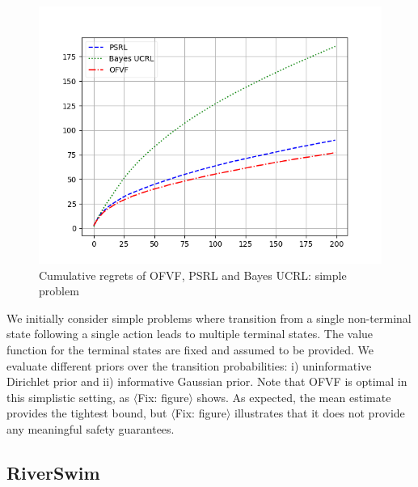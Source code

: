 \documentclass{article}
\newcommand{\fix}[1]{{$\langle${\color{red}\sc Fix: #1}$\rangle$}}
\begin{document}
\begin{figure}[h!]
	\centering
	\includegraphics[width=\linewidth]{figures/SimpleProblem_PSRL_BayesUCRL_OFVF.png}
	\caption{Cumulative regrets of OFVF, PSRL and Bayes UCRL:  simple problem}
	\label{fig:dirichlet_result_simple}
\end{figure}

We initially consider simple problems where transition from a single
non-terminal state following a single action leads to multiple
terminal states. The value function for the terminal states are fixed
and assumed to be provided. We evaluate different priors over the
transition probabilities: i) uninformative Dirichlet prior and ii)
informative Gaussian prior. Note that OFVF is optimal in this
simplistic setting, as \fix{figure} shows. As expected, the mean
estimate provides the tightest bound, but \fix{figure} illustrates
that it does not provide any meaningful safety guarantees.

\subsection{RiverSwim}
\end{document}
